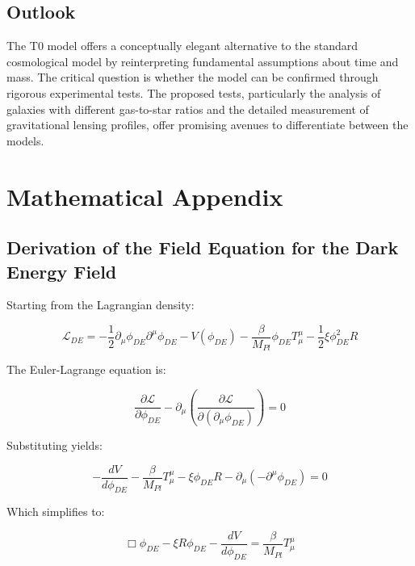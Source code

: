\documentclass[a4paper,12pt]{article}
\begin{document}
\subsection{Outlook}

The T0 model offers a conceptually elegant alternative to the standard cosmological model by reinterpreting fundamental assumptions about time and mass. The critical question is whether the model can be confirmed through rigorous experimental tests. The proposed tests, particularly the analysis of galaxies with different gas-to-star ratios and the detailed measurement of gravitational lensing profiles, offer promising avenues to differentiate between the models.

\appendix
\section{Mathematical Appendix}

\subsection{Derivation of the Field Equation for the Dark Energy Field}

Starting from the Lagrangian density:

\begin{equation}
	\mathcal{L}_{DE} = -\frac{1}{2}\partial_\mu \phi_{DE} \partial^\mu \phi_{DE} - V(\phi_{DE}) - \frac{\beta}{M_{Pl}}\phi_{DE}T^{\mu}_{\mu} - \frac{1}{2}\xi \phi_{DE}^2 R
\end{equation}

The Euler-Lagrange equation is:

\begin{equation}
	\frac{\partial \mathcal{L}}{\partial \phi_{DE}} - \partial_\mu \left(\frac{\partial \mathcal{L}}{\partial (\partial_\mu \phi_{DE})}\right) = 0
\end{equation}

Substituting yields:

\begin{equation}
	-\frac{dV}{d\phi_{DE}} - \frac{\beta}{M_{Pl}}T^{\mu}_{\mu} - \xi \phi_{DE} R - \partial_\mu\left(-\partial^\mu \phi_{DE}\right) = 0
\end{equation}

Which simplifies to:

\begin{equation}
	\Box\phi_{DE} - \xi R \phi_{DE} - \frac{dV}{d\phi_{DE}} = \frac{\beta}{M_{Pl}}T^{\mu}_{\mu}
\end{equation}
\end{document}
